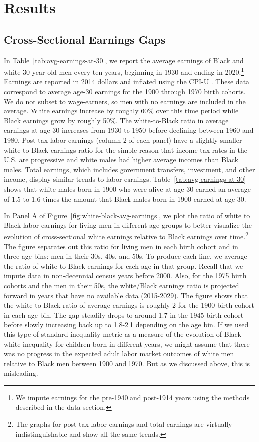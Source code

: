 \documentclass[12pt]{article}
\begin{document}
\section{Results\label{sec:results}}

\subsection{Cross-Sectional Earnings Gaps}

In Table~\ref{tab:avg-earnings-at-30}, we report the average earnings of Black and white 30 year-old men every ten years, beginning in 1930 and ending in 2020.\footnote{We impute earnings for the pre-1940 and post-1914 years using the methods described in the data section.} 
Earnings are reported in 2014 dollars and inflated using the CPI-U . 
These data correspond to average age-30 earnings for the 1900 through 1970 birth cohorts. 
We do not subset to wage-earners, so men with no earnings are included in the average. 
White earnings increase by roughly 60\% over this time period while Black earnings grow by roughly 50\%. 
The white-to-Black ratio in average earnings at age 30 increases from 1930 to 1950 before declining between 1960 and 1980. 
Post-tax labor earnings (column 2 of each panel) have a slightly smaller white-to-Black earnings ratio for the simple reason that income tax rates in the U.S. are progressive and white males had higher average incomes than Black males. 
Total earnings, which includes government transfers, investment, and other income, display similar trends to labor earnings. 
Table~\ref{tab:avg-earnings-at-30} shows that white males born in 1900 who were alive at age 30 earned an average of 1.5 to 1.6 times the amount that Black males born in 1900 earned at age 30.

In Panel A of Figure~\ref{fig:white-black-avg-earnings}, we plot the ratio of white to Black labor earnings for living men in different age groups to better visualize the evolution of cross-sectional white earnings relative to Black earnings over time.\footnote{The graphs for post-tax labor earnings and total earnings are virtually indistinguishable and show all the same trends.} 
The figure separates out this ratio for living men in each birth cohort and in three age bins: men in their 30s, 40s, and 50s. 
To produce each line, we average the ratio of white to Black earnings for each age in that group. 
Recall that we impute data in non-decennial census years before 2000. 
Also, for the 1975 birth cohorts and the men in their 50s, the white/Black earnings ratio is projected forward in years that have no available data (2015-2029). 
The figure shows that the white-to-Black ratio of average earnings is roughly 2 for the 1900 birth cohort in each age bin. 
The gap steadily drops to around 1.7 in the 1945 birth cohort before slowly increasing back up to 1.8-2.1 depending on the age bin. 
If we used this type of standard inequality metric as a measure of the evolution of Black-white inequality for children born in different years, we might assume that there was no progress in the expected adult labor market outcomes of white men relative to Black men between 1900 and 1970. 
But as we discussed above, this is misleading.
\end{document}
